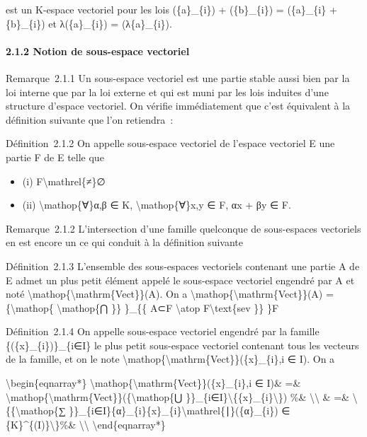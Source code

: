\documentclass[]{article}
\begin{document}
est un K-espace vectoriel pour les lois (\{a\}\_\{i\}) + (\{b\}\_\{i\})
= (\{a\}\_\{i\} + \{b\}\_\{i\}) et λ(\{a\}\_\{i\}) = (λ\{a\}\_\{i\}).

\paragraph{2.1.2 Notion de sous-espace vectoriel}

Remarque~2.1.1 Un sous-espace vectoriel est une partie stable aussi bien
par la loi interne que par la loi externe et qui est muni par les lois
induites d'une structure d'espace vectoriel. On vérifie immédiatement
que c'est équivalent à la définition suivante que l'on retiendra~:

Définition~2.1.2 On appelle sous-espace vectoriel de l'espace vectoriel
E une partie F de E telle que

\begin{itemize}
\itemsep1pt\parskip0pt
\item
  (i) F\textbackslash{}mathrel\{≠\}∅
\item
  (ii) \textbackslash{}mathop\{∀\}α,β ∈ K,
  \textbackslash{}mathop\{∀\}x,y ∈ F, αx + βy ∈ F.
\end{itemize}

Remarque~2.1.2 L'intersection d'une famille quelconque de sous-espaces
vectoriels en est encore un ce qui conduit à la définition suivante

Définition~2.1.3 L'ensemble des sous-espaces vectoriels contenant une
partie A de E admet un plus petit élément appelé le sous-espace
vectoriel engendré par A et noté
\textbackslash{}mathop\{\textbackslash{}mathrm\{Vect\}\}(A). On a
\textbackslash{}mathop\{\textbackslash{}mathrm\{Vect\}\}(A)
=\{\textbackslash{}mathop\{ \textbackslash{}mathop\{⋂ \}\} \}\_\{\{ A⊂F
\textbackslash{}atop F\textbackslash{}text\{sev \}\} \}F

Définition~2.1.4 On appelle sous-espace vectoriel engendré par la
famille \{(\{x\}\_\{i\})\}\_\{i∈I\} le plus petit sous-espace vectoriel
contenant tous les vecteurs de la famille, et on le note
\textbackslash{}mathop\{\textbackslash{}mathrm\{Vect\}\}(\{x\}\_\{i\},i
∈ I). On a

\textbackslash{}begin\{eqnarray*\}
\textbackslash{}mathop\{\textbackslash{}mathrm\{Vect\}\}(\{x\}\_\{i\},i
∈ I)\& =\&
\textbackslash{}mathop\{\textbackslash{}mathrm\{Vect\}\}(\{\textbackslash{}mathop\{⋃
\}\}\_\{i∈I\}\textbackslash{}\{\{x\}\_\{i\}\textbackslash{}\}) \%\&
\textbackslash{}\textbackslash{} \& =\&
\textbackslash{}\{\{\textbackslash{}mathop\{∑
\}\}\_\{i∈I\}\{α\}\_\{i\}\{x\}\_\{i\}\textbackslash{}mathrel\{∣\}(\{α\}\_\{i\})
∈ \{K\}\^{}\{(I)\}\textbackslash{}\}\%\&
\textbackslash{}\textbackslash{} \textbackslash{}end\{eqnarray*\}
\end{document}
